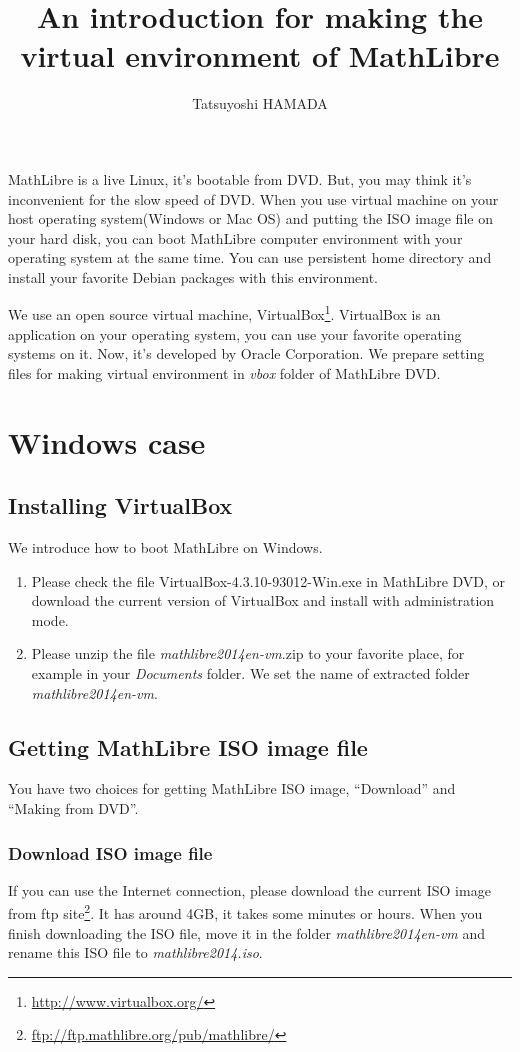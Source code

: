 \documentclass[a4]{article}
\title{An introduction for making the virtual environment of MathLibre}
\author{Tatsuyoshi HAMADA}
\newcommand{\vboxwin}{VirtualBox-4.3.10-93012-Win.exe}
\newcommand{\vm}{{\em mathlibre2014en-vm}}
\begin{document}
\maketitle
MathLibre is a live Linux, it's bootable from DVD.
But, you may think it's inconvenient for the slow speed of DVD.
When you use virtual machine on your host operating system(Windows or Mac OS) and
putting the ISO image file on your hard disk,
you can boot MathLibre computer environment with your operating system
at the same time.
You can use persistent home directory and install your favorite Debian
packages with this environment.

We use an open source virtual machine,
VirtualBox\footnote{\url{http://www.virtualbox.org/}}.
VirtualBox is an application on your operating system,
you can use your favorite operating systems on it.
Now, it's developed by Oracle Corporation.
We prepare setting files for making virtual environment 
in {\em vbox} folder of MathLibre DVD.

\section{Windows case}
\subsection{Installing VirtualBox}
We introduce how to boot MathLibre on Windows.
\begin{enumerate}
 \item Please check the file \vboxwin{} in MathLibre DVD, or download the
       current version of VirtualBox and install with administration mode.
 \item Please unzip the file \vm.zip{} to your favorite place, for example
       in your {\em Documents} folder. We set the name of extracted folder \vm{}.
\end{enumerate}

\subsection{Getting MathLibre ISO image file}
You have two choices for getting MathLibre ISO image,
``Download'' and ``Making from DVD''.

\subsubsection{Download ISO image file}
If you can use the Internet connection,
please download the current ISO image from ftp site\footnote{\url{ftp://ftp.mathlibre.org/pub/mathlibre/}}.
It has around 4GB, it takes some minutes or hours.
When you finish downloading the ISO file,
move it in the folder \vm{} and rename this ISO file to
{\em mathlibre2014.iso}. 
\end{document}
